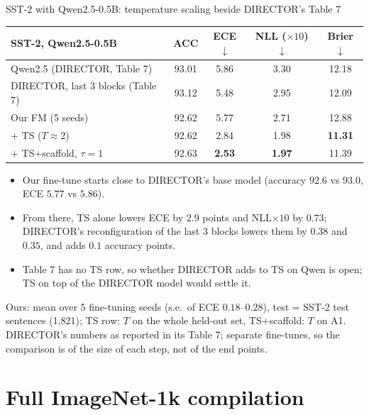 \documentclass[aspectratio=169,11pt]{beamer}
\newcommand{\source}[1]{\par\vfill{\scriptsize\color{inkgrey}#1}}
\begin{document}
\begin{frame}{SST-2 with Qwen2.5-0.5B: temperature scaling beside DIRECTOR's Table 7}
  \centering
  \small
  \begin{tabular}{@{}lcccc@{}}
    \toprule
    SST-2, Qwen2.5-0.5B & ACC & ECE$\downarrow$ & NLL ($\times10$)$\downarrow$ & Brier$\downarrow$\\
    \midrule
    Qwen2.5 (DIRECTOR, Table 7) & 93.01 & 5.86 & 3.30 & 12.18\\
    DIRECTOR, last 3 blocks (Table 7) & 93.12 & 5.48 & 2.95 & 12.09\\
    \midrule
    Our FM (5 seeds) & 92.62 & 5.77 & 2.71 & 12.88\\
    \quad + TS ($T\approx2$) & 92.62 & 2.84 & 1.98 & \textbf{11.31}\\
    \quad + TS+scaffold, $\tau=1$ & 92.63 & \textbf{2.53} & \textbf{1.97} & 11.39\\
    \bottomrule
  \end{tabular}
  \par\medskip\raggedright\small
  \begin{itemize}
    \item Our fine-tune starts close to DIRECTOR's base model (accuracy $92.6$ vs $93.0$, ECE $5.77$ vs $5.86$).
    \item From there, TS alone lowers ECE by $2.9$ points and NLL$\times10$ by $0.73$; DIRECTOR's reconfiguration of the last 3 blocks lowers them by $0.38$ and $0.35$, and adds $0.1$ accuracy points.
    \item Table 7 has no TS row, so whether DIRECTOR adds to TS on Qwen is open; TS on top of the DIRECTOR model would settle it.
  \end{itemize}
  \source{Ours: mean over 5 fine-tuning seeds (s.e.\ of ECE $0.18$--$0.28$), test = SST-2 test sentences (1,821); TS row: $T$ on the whole held-out set, TS+scaffold: $T$ on A1. DIRECTOR's numbers as reported in its Table 7; separate fine-tunes, so the comparison is of the size of each step, not of the end points.}
\end{frame}

\section{Full ImageNet-1k compilation}
\end{document}
